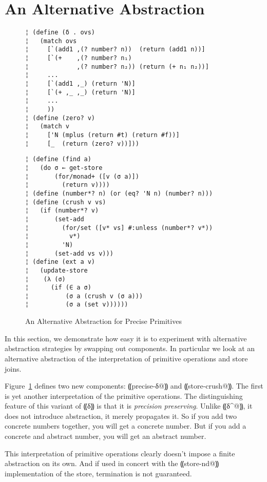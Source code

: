 \section{An Alternative Abstraction}\label{s:alt-abstraction}

\begin{figure}
\begin{lstlisting}
¦ (define (δ . ovs)
¦   (match ovs
¦     [`(add1 ,(? number? n))  (return (add1 n))]
¦     [`(+    ,(? number? n₁)
¦             ,(? number? n₂)) (return (+ n₁ n₂))]
¦     ...
¦     [`(add1 ,_) (return 'N)]
¦     [`(+ ,_ ,_) (return 'N)]
¦     ...
¦     ))
¦ (define (zero? v)
¦   (match v
¦     ['N (mplus (return #t) (return #f))]
¦     [_  (return (zero? v))]))
\end{lstlisting}
\figskip{}
\begin{lstlisting}
¦ (define (find a)
¦   (do σ ← get-store
¦       (for/monad+ ([v (σ a)])
¦         (return v))))
¦ (define (number*? n) (or (eq? 'N n) (number? n)))
¦ (define (crush v vs)
¦   (if (number*? v)
¦       (set-add 
¦         (for/set ([v* vs] #:unless (number*? v*)) 
¦           v*) 
¦         'N)
¦       (set-add vs v)))
¦ (define (ext a v)
¦   (update-store
¦    (λ (σ)
¦      (if (∈ a σ)
¦          (σ a (crush v (σ a)))
¦          (σ a (set v))))))
\end{lstlisting}
\caption{An Alternative Abstraction for Precise Primitives}
\label{f:pres-delta}
\end{figure}

In this section, we demonstrate how easy it is to experiment with
alternative abstraction strategies by swapping out components.  In
particular we look at an alternative abstraction of the interpretation
of primitive operations and store joins.

Figure~\ref{f:pres-delta} defines two new components:
⸨precise-δ@⸩ and ⸨store-crush@⸩.  The first is yet
another interpretation of the primitive operations.  The
distinguishing feature of this variant of ⸨δ⸩ is that it is
\emph{precision preserving}.  Unlike ⸨δ^@⸩, it does not
introduce abstraction, it merely propagates it.  So if you add two
concrete numbers together, you will get a concrete number.  But if you
add a concrete and abstract number, you will get an abstract number.

This interpretation of primitive operations clearly doesn't impose a
finite abstraction on its own.  And if used in concert with the
⸨store-nd@⸩ implementation of the store, termination is not
guaranteed.  

